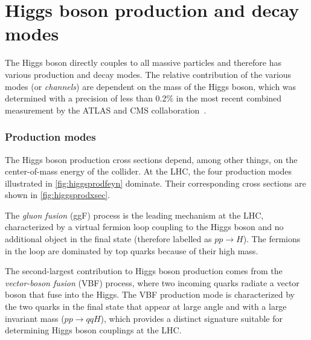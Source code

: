 

\section{Higgs boson production and decay modes}
\label{subsec:higgschannels}
The Higgs boson directly couples to all massive particles and therefore has various production and decay modes.
The relative contribution of the various modes (or \emph{channels}) are dependent on the mass of the Higgs boson, which was determined with a precision of less than 0.2\% in the most recent combined measurement by the ATLAS and CMS collaboration~\cite{HIGG-2014-14}.

\subsubsection{Production modes} 
The Higgs boson production cross sections depend, among other things, on the center-of-mass energy of the collider.
At the LHC, the four production modes illustrated in \cref{fig:higgsprodfeyn} dominate.
Their corresponding cross sections are shown in \cref{fig:higgsprodxsec}.

The \emph{gluon fusion} (ggF) process is the leading mechanism at the LHC, characterized by a virtual fermion loop coupling to the Higgs boson and no additional object in the final state (therefore labelled as $pp\rightarrow H$). 
The fermions in the loop are dominated by top quarks because of their high mass. 

The second-largest contribution to Higgs boson production comes from the \emph{vector-boson fusion} (VBF) process, where two incoming quarks radiate a vector boson that fuse into the Higgs.
The VBF production mode is characterized by the two quarks in the final state that appear at large angle and with a large invariant mass ($pp\rightarrow qqH$), which provides a distinct signature suitable for determining Higgs boson couplings at the LHC.

